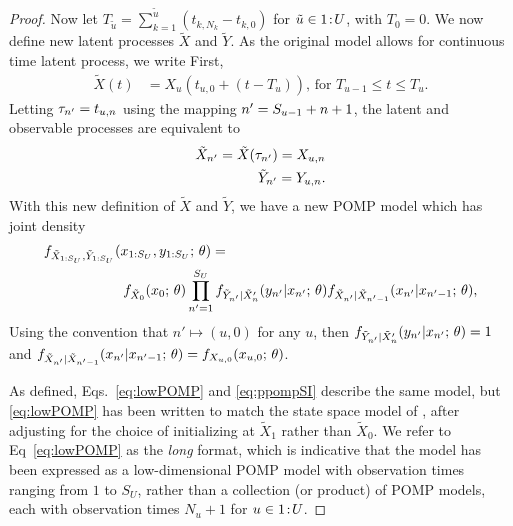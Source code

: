 \begin{proof}
  Now let $T_{\tilde{u}} = \sum_{k = 1}^{\tilde{u}} (t_{k, N_k} - t_{k, 0})$ for $\tilde{u} \in {1}\!:\!{U}$, with $T_0 = 0$.
  We now define new latent processes $\tilde{X}$ and $\tilde{Y}$. As the original model allows for continuous time latent process, we write 
  First,
  \begin{align}
    \tilde{X}(t) &= X_u(t_{u, 0} + (t - T_u)), \, \text{for} \,\, T_{u-1} \leq t \leq T_u.
  \end{align}
  Letting $\tau_{n'} = t_{u, n}$ using the mapping $n' = S_{u-1} + n + 1$, the latent and observable processes are equivalent to
  \begin{align*}
  \begin{split}
    \tilde{X}_{n'} = \tilde{X}(\tau_{n'}) = X_{u, n} \\
    \tilde{Y}_{n'} = Y_{u, n}. 
  \end{split}
  \end{align*}
  With this new definition of $\tilde{X}$ and $\tilde{Y}$, we have a new POMP model which has joint density
  \begin{align}
&f_{\tilde{X}_{1:S_U}, \tilde{Y}_{1:S_U}}(x_{1:S_U}, y_{1:S_U}; \, \theta) =  \nonumber
\\
& \hspace{20mm}
f_{\tilde{X}_0}(x_0;\, \theta)\prod_{\nstack = 1}^{S_{U}}f_{\tilde{Y}_{\nstack}|\tilde{X}_\nstack}(y_{\nstack} | x_{\nstack}; \, \theta)f_{\tilde{X}_{\nstack}|\tilde{X}_{\nstack - 1}}(x_{\nstack} | x_{\nstack - 1}; \, \theta), \label{eq:lowPOMP}
  \end{align}
  Using the convention that $n' \mapsto (u,0)$ for any $u$, then $f_{\tilde{Y}_{n'}|\tilde{X}_n'}(y_{n'} | x_{n'}; \, \theta) = 1$ and \linebreak $f_{\tilde{X}_{n'}|\tilde{X}_{n' - 1}}(x_{n'} | x_{n' - 1}; \, \theta) = f_{X_{u, 0}}(x_{u, 0}; \, \theta)$.

  As defined, Eqs.~\ref{eq:lowPOMP} and \ref{eq:ppompSI} describe the same model, but \ref{eq:lowPOMP} has been written to match the state space model of \citet{chen24}, after adjusting for the choice of initializing at $\tilde{X}_1$ rather than $\tilde{X}_0$. 
  We refer to Eq~\ref{eq:lowPOMP} as the \emph{long} format, which is indicative that the model has been expressed as a low-dimensional POMP model with observation times ranging from $1$ to $S_U$, rather than a collection (or product) of POMP models, each with observation times $N_u+1$ for $u \in {1}\!:\!{U}$. 
  

\end{proof}
